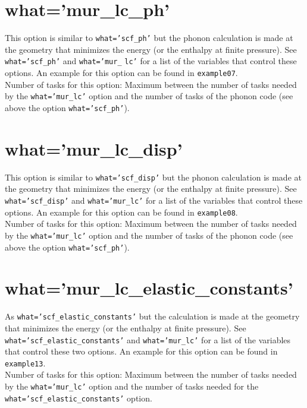 \documentclass[12pt,a4paper,twoside]{report}
\begin{document}
\newpage
{\color{coral}\section{what='mur\_lc\_ph'}}
\color{black}
This option is similar to \texttt{what='scf\_ph'} but the phonon calculation
is made at the geometry that minimizes the energy (or the enthalpy
at finite pressure).
See \texttt{what='scf\_ph'} and \texttt{what='mur\_} \texttt{lc'} for a
list of the variables that control these options. 
An example for this option can be found in \texttt{example07}. \\
Number of tasks for this option: Maximum between the number of tasks 
needed by the \texttt{what='mur\_lc'} option and the number
of tasks of the phonon code (see above the option \texttt{what='scf\_ph'}).

\newpage
{\color{coral}\section{what='mur\_lc\_disp'}}
\color{black}
This option is similar to \texttt{what='scf\_disp'} but the phonon calculation
is made at the geometry that minimizes the energy (or the enthalpy
at finite pressure).
See \texttt{what='scf\_disp'} and \texttt{what='mur\_lc'} for a
list of the variables that control these options. 
An example for this option can be found in \texttt{example08}. \\
Number of tasks for this option: Maximum between the number of tasks  
needed by the \texttt{what='mur\_lc'} option and the number
of tasks of the phonon code (see above the option \texttt{what='scf\_ph'}).

\newpage
{\color{coral}\section{what='mur\_lc\_elastic\_constants'}}
\color{black}
As \texttt{what='scf\_elastic\_constants'} but the calculation is made at the
geometry that minimizes the energy (or the enthalpy at finite pressure). 
See \texttt{what='scf\_elastic\_constants'} and \texttt{what='mur\_lc'} for 
a list of the variables that control these two options.
An example for this option can be found in \texttt{example13}. \\
Number of tasks for this option: Maximum between the number of tasks
needed by the \texttt{what='mur\_lc'} option and the number of tasks
needed for the \texttt{what='scf\_elastic\_constants'} option.
\end{document}
